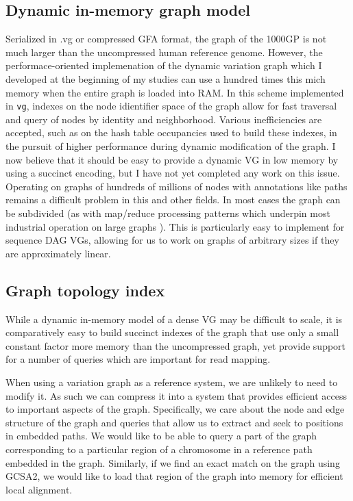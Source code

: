 \subsection{Dynamic in-memory graph model}

Serialized in .vg or compressed GFA format, the graph of the 1000GP is not much larger than the uncompressed human reference genome.
However, the performace-oriented implemenation of the dynamic variation graph which I developed at the beginning of my studies can use a hundred times this mich memory when the entire graph is loaded into RAM.
In this scheme implemented in {\tt vg}, indexes on the node idientifier space of the graph allow for fast traversal and query of nodes by identity and neighborhood.
Various inefficiencies are accepted, such as on the hash table occupancies used to build these indexes, in the pursuit of higher performance during dynamic modification of the graph.
I now believe that it should be easy to provide a dynamic VG in low memory by using a succinct encoding, but I have not yet completed any work on this issue.
Operating on graphs of hundreds of millions of nodes with annotations like paths remains a difficult problem in this and other fields.
In most cases the graph can be subdivided (as with map/reduce processing patterns \cite{dean2008mapreduce} which underpin most industrial operation on large graphs \cite{cohen2009graph}).
This is particularly easy to implement for sequence DAG VGs, allowing for us to work on graphs of arbitrary sizes if they are approximately linear.

\subsection{Graph topology index}
\label{sec:graph_topology_index}
While a dynamic in-memory model of a dense VG may be difficult to scale, it is comparatively easy to build succinct indexes of the graph that use only a small constant factor more memory than the uncompressed graph, yet provide support for a number of queries which are important for read mapping.

When using a variation graph as a reference system, we are unlikely to need to modify it.
As such we can compress it into a system that provides efficient access to important aspects of the graph.
Specifically, we care about the node and edge structure of the graph and queries that allow us to extract and seek to positions in embedded paths.
We would like to be able to query a part of the graph corresponding to a particular region of a chromosome in a reference path embedded in the graph.
Similarly, if we find an exact match on the graph using GCSA2, we would like to load that region of the graph into memory for efficient local alignment.

